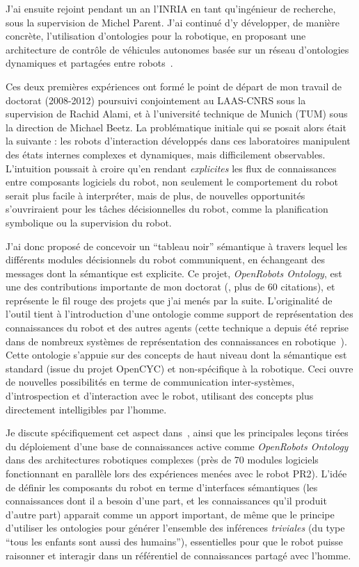 \documentclass[a4paper]{article}
\begin{document}
J'ai ensuite rejoint pendant un an l'INRIA en tant qu'ingénieur de recherche,
sous la supervision de Michel Parent.  J'ai continué d'y développer, de manière
concrète, l'utilisation d'ontologies pour la robotique, en proposant une
architecture de contrôle de véhicules autonomes basée sur un réseau d'ontologies
dynamiques et partagées entre robots~\cite{mehani2007networking}.

Ces deux premières expériences ont formé le point de départ de mon travail de
doctorat (2008-2012) poursuivi conjointement au LAAS-CNRS sous la supervision de
Rachid Alami, et à l'université technique de Munich (TUM) sous la direction de
Michael Beetz. La problématique initiale qui se posait alors était la suivante :
les robots d'interaction développés dans ces laboratoires manipulent des états
internes complexes et dynamiques, mais difficilement observables. L'intuition
poussait à croire qu'en rendant \emph{explicites} les flux de connaissances
entre composants logiciels du robot, non seulement le comportement du robot
serait plus facile à interpréter, mais de plus, de nouvelles opportunités
s'ouvriraient pour les tâches décisionnelles du robot, comme la planification
symbolique ou la supervision du robot.

J'ai donc proposé de concevoir un ``tableau noir'' sémantique à travers lequel
les différents modules décisionnels du robot communiquent, en échangeant des
messages dont la sémantique est explicite. Ce projet, \emph{OpenRobots
Ontology}, est une des contributions importante de mon doctorat
(\cite{lemaignan2010oro}, plus de 60 citations), et représente le fil rouge des
projets que j'ai menés par la suite. L'originalité de l'outil tient à
l'introduction d'une ontologie comme support de représentation des connaissances
du robot et des autres agents (cette technique a depuis été reprise dans de
nombreux systèmes de représentation des connaissances en
robotique~\cite{lemaignan2012symbolic}). Cette ontologie s'appuie sur des
concepts de haut niveau dont la sémantique est standard (issue du projet {\sc
OpenCYC}) et non-spécifique à la robotique. Ceci ouvre de nouvelles possibilités
en terme de communication inter-systèmes, d'introspection et d'interaction avec
le robot, utilisant des concepts plus directement intelligibles par l'homme.

Je discute spécifiquement cet aspect dans~\cite{lemaignan2013explicit}, ainsi
que les principales leçons tirées du déploiement d'une base de connaissances
active comme \emph{OpenRobots Ontology} dans des architectures robotiques
complexes (près de 70 modules logiciels fonctionnant en parallèle lors des
expériences menées avec le robot PR2). L'idée de définir les composants du robot
en terme d'interfaces sémantiques (les connaissances dont il a besoin d'une
part, et les connaissances qu'il produit d'autre part) apparait comme un apport
important, de même que le principe d'utiliser les ontologies pour générer
l'ensemble des inférences \emph{triviales} (du type ``tous les enfants sont
aussi des humains''), essentielles pour que le robot puisse raisonner et
interagir dans un référentiel de connaissances partagé avec l'homme.
\end{document}

